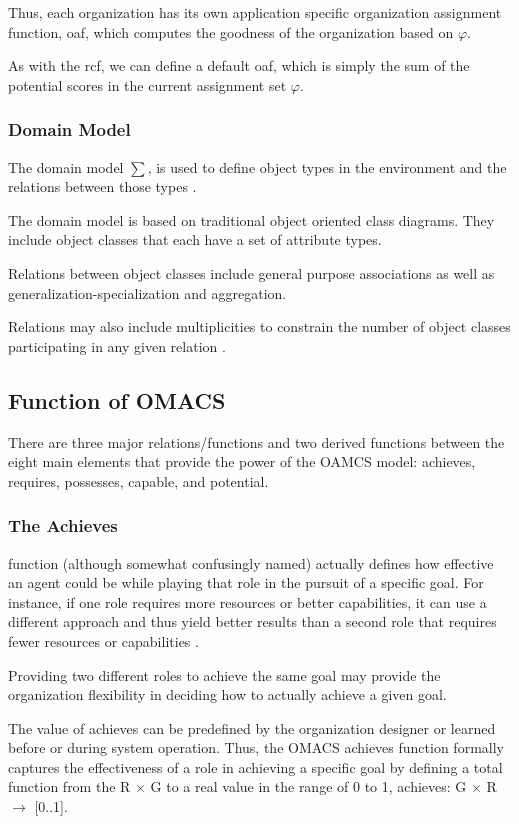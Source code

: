 Thus, each organization has its own application specific organization assignment function, oaf, which computes the goodness of the organization based on $\varphi$. 
	
As with the rcf, we can define a default oaf, which is simply the sum of the potential scores in the current assignment set $\varphi$.
 
 
\subsubsection{Domain Model} 

The domain model $\sum$, is used to define object types in the environment 
and the relations between those types \cite{omacs2}.

The domain model is based on traditional object oriented class diagrams. They
include object classes that each have a set of attribute types. 

Relations between object classes include general purpose associations
 as well as generalization-specialization and aggregation.
 
Relations may also include multiplicities to constrain the number of object classes participating in
any given relation \cite{omacs2}.
 
\subsection{Function of OMACS}

There are three major relations/functions and two derived functions between the eight main elements that provide the power of the OAMCS model: achieves, requires, possesses, capable, and potential. 
\subsubsection{The Achieves}
function (although somewhat confusingly named) actually defines how effective an agent could be while playing that role in the pursuit of a specific goal. For instance, if one role requires more resources or better capabilities, it can use a different approach and thus yield better results than a second role that requires fewer resources or capabilities \cite{omacs4}.

Providing two different roles to achieve the same goal may provide the organization flexibility in deciding how to actually achieve a given goal.

The value of achieves can be predefined by the organization designer or learned before or during system operation. Thus, the OMACS achieves function formally captures the effectiveness of a role in achieving a specific goal by defining a total function from the R $\times$ G to a real value in the range of 0 to 1, achieves: G $\times$ R $\rightarrow$ {[}0..1{]}.
 
